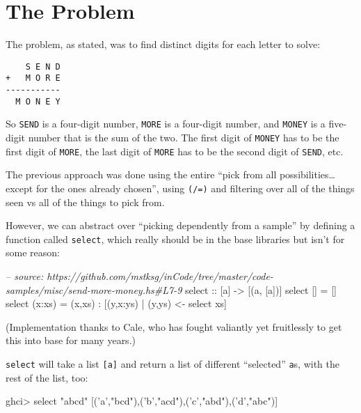 \documentclass[]{article}
\newenvironment{Shaded}{}{}
\newcommand{\CharTok}[1]{\textcolor[rgb]{0.25,0.44,0.63}{#1}}
\newcommand{\StringTok}[1]{\textcolor[rgb]{0.25,0.44,0.63}{#1}}
\newcommand{\CommentTok}[1]{\textcolor[rgb]{0.38,0.63,0.69}{\textit{#1}}}
\newcommand{\OtherTok}[1]{\textcolor[rgb]{0.00,0.44,0.13}{#1}}
\newcommand{\FunctionTok}[1]{\textcolor[rgb]{0.02,0.16,0.49}{#1}}
\newcommand{\NormalTok}[1]{#1}
\begin{document}
\section{The Problem}\label{the-problem}

The problem, as stated, was to find distinct digits for each letter to solve:

\begin{verbatim}
    S E N D
+   M O R E
-----------
  M O N E Y
\end{verbatim}

So \texttt{SEND} is a four-digit number, \texttt{MORE} is a four-digit number,
and \texttt{MONEY} is a five-digit number that is the sum of the two. The first
digit of \texttt{MONEY} has to be the first digit of \texttt{MORE}, the last
digit of \texttt{MORE} has to be the second digit of \texttt{SEND}, etc.

The previous approach was done using the entire ``pick from all
possibilities\ldots{}except for the ones already chosen'', using \texttt{(/=)}
and filtering over all of the things seen vs all of the things to pick from.

However, we can abstract over ``picking dependently from a sample'' by defining
a function called \texttt{select}, which really should be in the base libraries
but isn't for some reason:

\begin{Shaded}
\begin{Highlighting}[]
\CommentTok{-- source: https://github.com/mstksg/inCode/tree/master/code-samples/misc/send-more-money.hs#L7-9}
\OtherTok{select ::}\NormalTok{ [a] }\OtherTok{->}\NormalTok{ [(a, [a])]}
\NormalTok{select []     }\FunctionTok{=}\NormalTok{ []}
\NormalTok{select (x}\FunctionTok{:}\NormalTok{xs) }\FunctionTok{=}\NormalTok{ (x,xs) }\FunctionTok{:}\NormalTok{ [(y,x}\FunctionTok{:}\NormalTok{ys) }\FunctionTok{|}\NormalTok{ (y,ys) }\OtherTok{<-}\NormalTok{ select xs]}
\end{Highlighting}
\end{Shaded}

(Implementation thanks to Cale, who has fought valiantly yet fruitlessly to get
this into base for many years.)

\texttt{select} will take a list \texttt{{[}a{]}} and return a list of different
``selected'' \texttt{a}s, with the rest of the list, too:

\begin{Shaded}
\begin{Highlighting}[]
\NormalTok{ghci}\FunctionTok{>}\NormalTok{ select }\StringTok{"abcd"}
\NormalTok{[(}\CharTok{'a'}\NormalTok{,}\StringTok{"bcd"}\NormalTok{),(}\CharTok{'b'}\NormalTok{,}\StringTok{"acd"}\NormalTok{),(}\CharTok{'c'}\NormalTok{,}\StringTok{"abd"}\NormalTok{),(}\CharTok{'d'}\NormalTok{,}\StringTok{"abc"}\NormalTok{)]}
\end{Highlighting}
\end{Shaded}
\end{document}
